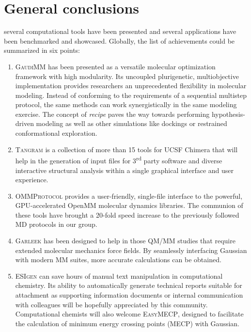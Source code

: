 \chapter{General conclusions}
\label{chap:07}

 several computational tools have been presented and several applications have been benchmarked and showcased. Globally, the list of achievements could be summarized in six points:



\begin{enumerate}
	\item \textsc{GaudiMM} has been presented as a versatile molecular optimization framework with high modularity. Its uncoupled plurigenetic, multiobjective implementation provides researchers an unprecedented flexibility in molecular modeling. Instead of conforming to the requirements of a sequential multistep protocol, the same methods can work synergistically in the same modeling exercise. The concept of \textit{recipe} paves the way towards performing hypothesis-driven modeling as well as other simulations like dockings or restrained conformational exploration.

	\item \textsc{Tangram} is a collection of more than 15 tools for UCSF Chimera that will help in the generation of input files for 3\textsuperscript{rd} party software and diverse interactive structural analysis within a single graphical interface and user experience.

	\item \textsc{OMMProtocol} provides a user-friendly, single-file interface to the powerful, GPU-accelerated OpenMM molecular dynamics libraries. The communion of these tools have brought a 20-fold speed increase to the previously followed MD protocols in our group.

	\item \textsc{Garleek} has been designed to help in those QM/MM studies that require extended molecular mechanics force fields. By seamlessly interfacing Gaussian with modern MM suites, more accurate calculations can be obtained.

	\item \textsc{ESIgen} can save hours of manual text manipulation in computational chemistry. Its ability to automatically generate technical reports suitable for attachment as supporting information documents or internal communication with colleagues will be hopefully appreciated by this community. Computational chemists will also welcome \textsc{EasyMECP}, designed to facilitate the calculation of minimum energy crossing points (MECP) with Gaussian.

\end{enumerate}


